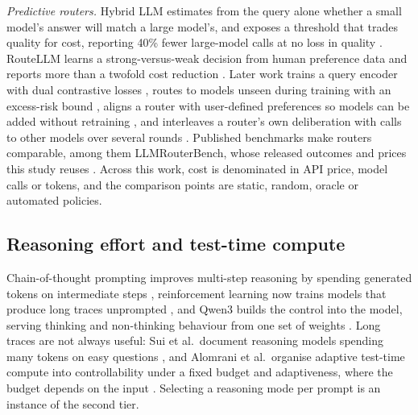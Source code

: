 \emph{Predictive routers.} Hybrid LLM estimates from the query alone whether
a small model's answer will match a large model's, and exposes a threshold
that trades quality for cost, reporting 40\% fewer large-model calls at no
loss in quality \cite{ding2024hybridllm}. RouteLLM learns a strong-versus-weak
decision from human preference data and reports more than a twofold cost
reduction \cite{ong2024routellm}. Later work trains a query encoder
with dual contrastive losses \cite{chen2024routerdc}, routes to models unseen
during training with an excess-risk bound \cite{jitkrittum2025universal},
aligns a router with user-defined preferences so models can be added without
retraining \cite{tran2025archrouter}, and interleaves a router's own
deliberation with calls to other models over several rounds
\cite{zhang2025routerr1}. Published benchmarks make routers comparable, among
them LLMRouterBench, whose released outcomes and prices this study reuses
\cite{li2026llmrouterbench}. Across this work, cost is denominated in API
price, model calls or tokens, and the comparison points are static, random,
oracle or automated policies.

\subsection{Reasoning effort and test-time compute}
\label{sec:related-reasoning}

Chain-of-thought prompting improves multi-step reasoning by spending
generated tokens on intermediate steps \cite{wei2022cot}, reinforcement
learning now trains models that produce long traces unprompted
\cite{deepseek2025r1}, and Qwen3 builds the control into the model, serving
thinking and non-thinking behaviour from one set of weights \cite{qwen3}.
Long traces are not always useful: Sui
et al.\ document reasoning models spending many tokens on easy questions
\cite{sui2025stopoverthinking}, and Alomrani et al.\ organise adaptive
test-time compute into controllability under a fixed budget and adaptiveness,
where the budget depends on the input \cite{alomrani2025reasoningbudget}.
Selecting a reasoning mode per prompt is an instance of the second tier.

